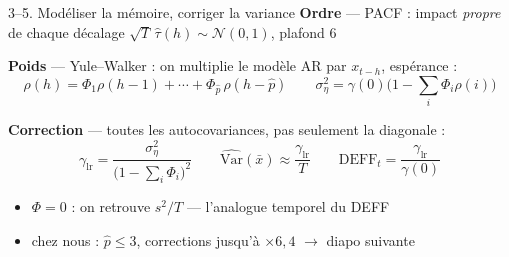 \documentclass[10pt]{beamer}
\begin{document}
\begin{frame}{3--5. Modéliser la mémoire, corriger la variance}
  \textbf{Ordre} --- PACF : impact \emph{propre} de chaque décalage
  \hfill {\footnotesize $\sqrt T\,\hat\tau(h)\sim\mathcal N(0,1)$, plafond 6}
  \vspace{3mm}

  \textbf{Poids} --- Yule--Walker : on multiplie le modèle AR par $x_{t-h}$,
  espérance :
  \[
    \rho(h) = \Phi_1\rho(h-1)+\cdots+\Phi_{\hat p}\,\rho(h-\hat p)
    \qquad
    \sigma^2_\eta = \gamma(0)\bigl(1-\textstyle\sum_i\Phi_i\rho(i)\bigr)
  \]
  \vspace{1mm}

  \textbf{Correction} --- toutes les autocovariances, pas seulement la
  diagonale :
  \[
    \gamma_{\mathrm{lr}} = \frac{\sigma^2_\eta}{\bigl(1-\sum_i \Phi_i\bigr)^2}
    \qquad
    \widehat{\mathrm{Var}}(\bar x)\approx\frac{\gamma_{\mathrm{lr}}}{T}
    \qquad
    \mathrm{DEFF}_t = \frac{\gamma_{\mathrm{lr}}}{\gamma(0)}
  \]
  \vspace{3mm}
  \begin{itemize}\setlength{\itemsep}{2mm}
    \item $\Phi=0$ : on retrouve $s^2/T$ --- l'analogue temporel du DEFF
    \item chez nous : $\hat p \le 3$, corrections jusqu'à $\times 6{,}4$
      $\to$ diapo suivante
  \end{itemize}
\end{frame}
\end{document}

